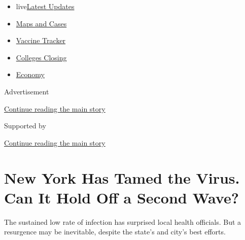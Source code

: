 \begin{itemize}
\tightlist
\item
  live\href{https://www.nytimes3xbfgragh.onion/2020/08/21/world/covid-19-coronavirus.html?name=styln-coronavirus-national\&region=TOP_BANNER\&variant=undefined\&block=storyline_menu_recirc\&action=click\&pgtype=Article\&impression_id=01886650-e395-11ea-a793-353d552722af}{Latest
  Updates}
\item
  \href{https://www.nytimes3xbfgragh.onion/interactive/2020/us/coronavirus-us-cases.html?name=styln-coronavirus-national\&region=TOP_BANNER\&variant=undefined\&block=storyline_menu_recirc\&action=click\&pgtype=Article\&impression_id=01886651-e395-11ea-a793-353d552722af}{Maps
  and Cases}
\item
  \href{https://www.nytimes3xbfgragh.onion/interactive/2020/science/coronavirus-vaccine-tracker.html?name=styln-coronavirus-national\&region=TOP_BANNER\&variant=undefined\&block=storyline_menu_recirc\&action=click\&pgtype=Article\&impression_id=01886652-e395-11ea-a793-353d552722af}{Vaccine
  Tracker}
\item
  \href{https://www.nytimes3xbfgragh.onion/2020/08/19/us/colleges-closing-covid.html?name=styln-coronavirus-national\&region=TOP_BANNER\&variant=undefined\&block=storyline_menu_recirc\&action=click\&pgtype=Article\&impression_id=01886653-e395-11ea-a793-353d552722af}{Colleges
  Closing}
\item
  \href{https://www.nytimes3xbfgragh.onion/live/2020/08/20/business/stock-market-today-coronavirus?name=styln-coronavirus-national\&region=TOP_BANNER\&variant=undefined\&block=storyline_menu_recirc\&action=click\&pgtype=Article\&impression_id=01886654-e395-11ea-a793-353d552722af}{Economy}
\end{itemize}

Advertisement

\protect\hyperlink{after-top}{Continue reading the main story}

Supported by

\protect\hyperlink{after-sponsor}{Continue reading the main story}

\hypertarget{new-york-has-tamed-the-virus-can-it-hold-off-a-second-wave}{%
\section{New York Has Tamed the Virus. Can It Hold Off a Second
Wave?}\label{new-york-has-tamed-the-virus-can-it-hold-off-a-second-wave}}

The sustained low rate of infection has surprised local health
officials. But a resurgence may be inevitable, despite the state's and
city's best efforts.

